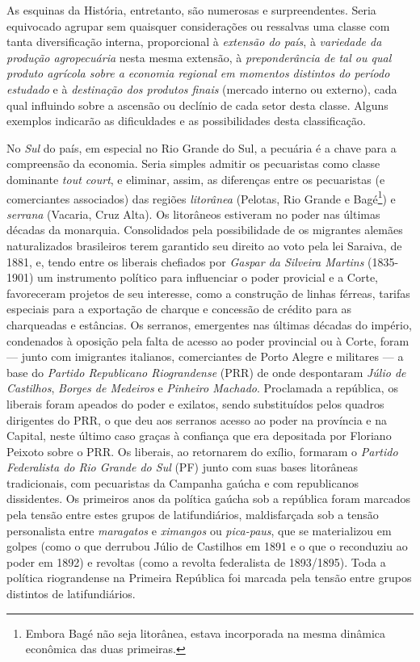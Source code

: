 As esquinas da História, entretanto, são numerosas e surpreendentes. Seria equivocado agrupar sem quaisquer considerações ou ressalvas uma classe com tanta diversificação interna, proporcional à \textit{extensão do país}, à \textit{variedade da produção agropecuária} nesta mesma extensão, à \textit{preponderância de tal ou qual produto agrícola sobre a economia regional em momentos distintos do período estudado} e à \textit{destinação dos produtos finais} (mercado interno ou externo), cada qual influindo sobre a ascensão ou declínio de cada setor desta classe. Alguns exemplos indicarão as dificuldades e as possibilidades desta classificação.

No \textit{Sul} do país, em especial no Rio Grande do Sul, a pecuária é a chave para a compreensão da economia. Seria simples admitir os pecuaristas como classe dominante \textit{tout court}, e eliminar, assim, as diferenças entre os pecuaristas (e comerciantes associados) das regiões \textit{litorânea} (Pelotas, Rio Grande e Bagé\footnote{Embora Bagé não seja litorânea, estava incorporada na mesma dinâmica econômica das duas primeiras.}) e \textit{serrana} (Vacaria, Cruz Alta). Os litorâneos estiveram no poder nas últimas décadas da monarquia. Consolidados pela possibilidade de os migrantes alemães naturalizados brasileiros terem garantido seu direito ao voto pela lei Saraiva, de 1881, e, tendo entre os liberais chefiados por \textit{Gaspar da Silveira Martins} (1835-1901) um instrumento político para influenciar o poder provicial e a Corte, favoreceram projetos de seu interesse, como a construção de linhas férreas, tarifas especiais para a exportação de charque e concessão de crédito para as charqueadas e estâncias. Os serranos, emergentes nas últimas décadas do império, condenados à oposição pela falta de acesso ao poder provincial ou à Corte, foram --- junto com imigrantes italianos, comerciantes de Porto Alegre e militares --- a base do \textit{Partido Republicano Riograndense} (PRR) de onde despontaram \textit{Júlio de Castilhos}, \textit{Borges de Medeiros} e \textit{Pinheiro Machado}. Proclamada a república, os liberais foram apeados do poder e exilatos, sendo substituídos pelos quadros dirigentes do PRR, o que deu aos serranos acesso ao poder na província e na Capital, neste último caso graças à confiança que era depositada por Floriano Peixoto sobre o PRR. Os liberais, ao retornarem do exílio, formaram o \textit{Partido Federalista do Rio Grande do Sul} (PF) junto com suas bases litorâneas tradicionais, com pecuaristas da Campanha gaúcha e com republicanos dissidentes. Os primeiros anos da política gaúcha sob a república foram marcados pela tensão entre estes grupos de latifundiários, maldisfarçada sob a tensão personalista entre \textit{maragatos} e \textit{ximangos} ou \textit{pica-paus}, que se materializou em golpes (como o que derrubou Júlio de Castilhos em 1891 e o que o reconduziu ao poder em 1892) e revoltas (como a revolta federalista de 1893/1895). Toda a política riograndense na Primeira República foi marcada pela tensão entre grupos distintos de latifundiários.


